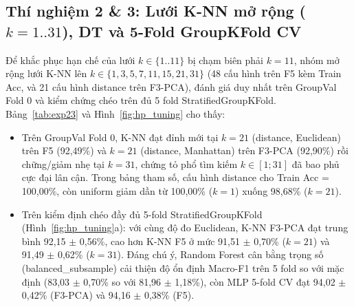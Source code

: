 \documentclass[conference]{IEEEtran}
\begin{document}
\subsection{Thí nghiệm 2 \& 3: Lưới K-NN mở rộng (\texorpdfstring{$k=1..31$}{k=1..31}), DT và 5-Fold GroupKFold CV}
Để khắc phục hạn chế của lưới $k \in \{1..11\}$ bị chạm biên phải $k=11$, nhóm mở rộng lưới K-NN lên $k \in \{1, 3, 5, 7, 11, 15, 21, 31\}$ (48 cấu hình trên F5 kèm Train Acc, và 21 cấu hình distance trên F3-PCA), đánh giá duy nhất trên GroupVal Fold 0 và kiểm chứng chéo trên đủ 5 fold StratifiedGroupKFold. Bảng~\ref{tab:exp23} và Hình~\ref{fig:hp_tuning} cho thấy:
\begin{itemize}
  \item Trên GroupVal Fold 0, K-NN đạt đỉnh mới tại $k=21$ (distance, Euclidean) trên F5 (92,49\%) và $k=21$ (distance, Manhattan) trên F3-PCA (92,90\%) rồi chững/giảm nhẹ tại $k=31$, chứng tỏ phổ tìm kiếm $k \in [1; 31]$ đã bao phủ cực đại lân cận. Trong bảng tham số, cấu hình distance cho Train Acc = 100,00\%, còn uniform giảm dần từ 100,00\% ($k=1$) xuống 98,68\% ($k=21$).
  \item Trên kiểm định chéo đầy đủ 5-fold StratifiedGroupKFold (Hình~\ref{fig:hp_tuning}a): với cùng độ đo Euclidean, K-NN F3-PCA đạt trung bình 92,15 $\pm$ 0,56\%, cao hơn K-NN F5 ở mức 91,51 $\pm$ 0,70\% ($k=21$) và 91,49 $\pm$ 0,62\% ($k=31$). Đáng chú ý, Random Forest cân bằng trọng số (balanced\_subsample) cải thiện độ ổn định Macro-F1 trên 5 fold so với mặc định (83,03 $\pm$ 0,70\% so với 81,96 $\pm$ 1,18\%), còn MLP 5-fold CV đạt 94,02 $\pm$ 0,42\% (F3-PCA) và 94,16 $\pm$ 0,38\% (F5).
\end{itemize}
\end{document}
